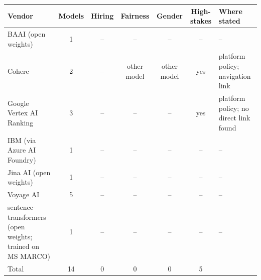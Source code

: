 \begin{tabular}{lcccccl}
\toprule
Vendor & Models & Hiring & Fairness & Gender & High-stakes & Where stated \\
\midrule
BAAI (open weights) & 1 & -- & -- & -- & -- & -- \\
Cohere & 2 & -- & other model & other model & yes & platform policy; navigation link \\
Google Vertex AI Ranking & 3 & -- & -- & -- & yes & platform policy; no direct link found \\
IBM (via Azure AI Foundry) & 1 & -- & -- & -- & -- & -- \\
Jina AI (open weights) & 1 & -- & -- & -- & -- & -- \\
Voyage AI & 5 & -- & -- & -- & -- & -- \\
sentence-transformers (open weights; trained on MS MARCO) & 1 & -- & -- & -- & -- & -- \\
\midrule
Total & 14 & 0 & 0 & 0 & 5 & \\
\bottomrule
\end{tabular}
